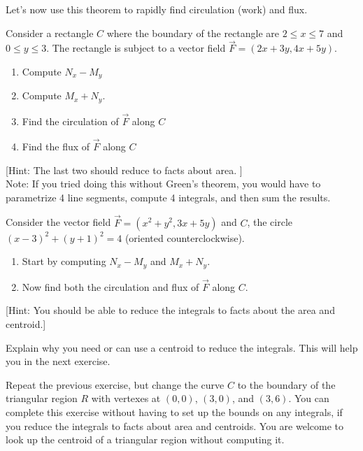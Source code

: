 Let's now use this theorem to rapidly find circulation (work) and flux.


\begin{problem}
%
 Consider a rectangle $C$ where the boundary of the rectangle are $2\leq x\leq 7$ and $0\leq y\leq 3$. The rectangle is subject to a vector field $\vec F=(2x+3y,4x+5y)$. 
\begin{enumerate}
	\item Compute $N_x-M_y$
	\item Compute $M_x+N_y$.
	\item Find the circulation of $\vec F$ along $C$
	\item Find the flux of $\vec F$ along $C$
\end{enumerate}
[Hint: The last two should reduce to facts about area. ]\\
Note: If you tried doing this without Green's theorem, you would have to parametrize 4 line segments, compute 4 integrals, and then sum the results.
\end{problem}

\begin{problem}
 Consider the vector field $\vec F=(x^2+y^2,3x+5y)$ and $C$, the circle $(x-3)^2+(y+1)^2=4$ (oriented counterclockwise).
\begin{enumerate}
	\item Start by computing $N_x-M_y$ and $M_x+N_y$. 
	\item Now find both the circulation and flux of $\vec F$ along $C$. 
\end{enumerate}
[Hint: You should be able to reduce the integrals to facts about the area and centroid.]
\end{problem}

\begin{problem*}
Explain why you need or can use a centroid to reduce the integrals. This will help you in the next exercise.
\end{problem*}


\begin{problem}
Repeat the previous exercise, but change the curve $C$ to the boundary of the triangular region $R$ with vertexes at $(0,0)$, $(3,0)$, and $(3,6)$.  You can complete this exercise without having to set up the bounds on any integrals, if you reduce the integrals to facts about area and centroids. You are welcome to look up the centroid of a triangular region without computing it.
\end{problem}


